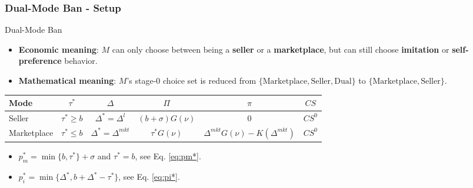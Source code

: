 \begin{frame}
\begin{center}
  \end{center}
  
\end{frame}

\begin{frame}
  \frametitle{Dual-Mode Ban - Setup}
  \small

  \begin{block}{Dual-Mode Ban}
    \begin{itemize}
      \item \textbf{Economic meaning}: $M$ can only choose between being a \textbf{seller} or a \textbf{marketplace}, but can still choose \textbf{imitation} or \textbf{self-preference} behavior.
      \item \textbf{Mathematical meaning}: $M$'s stage-0 choice set is reduced from $\{\text{Marketplace},\text{Seller},\text{Dual}\}$ to $\{\text{Marketplace},\text{Seller}\}$.
    \end{itemize}
  \end{block}

  \vspace{-0.2cm}
    \begin{table}
      \centering
    \begin{tabular}{@{}lccccc@{}}
      \toprule
      Mode & $\tau^*$ & $\Delta$ & $\Pi$ & $\pi$  & $CS$ \\
      \midrule
      Seller
        & $\tau^* \geq b$
        & $\Delta^*=\Delta^l$
        & $(b+\sigma)G(\nu)$
        & $0$
        & $CS^0$\\
      Marketplace
        & $\tau^* \leq b$
        & $\Delta^*=\Delta^{mkt}$
        & $\tau^* G(\nu)$
        & $\Delta^{mkt}G(\nu)-K(\Delta^{mkt})$
        & $CS^0$ \\
      \bottomrule
    \end{tabular}
  \end{table}

  \begin{itemize}
    \item $p^*_m = \min\{b, \tau^*\} + \sigma$ and $\tau^* = b$, see Eq. \eqref{eq:pm*}.
    \item $p^*_i = \min\{\Delta^*, b + \Delta^* - \tau^*\}$, see Eq. \eqref{eq:pi*}.
  \end{itemize}
\end{frame}

